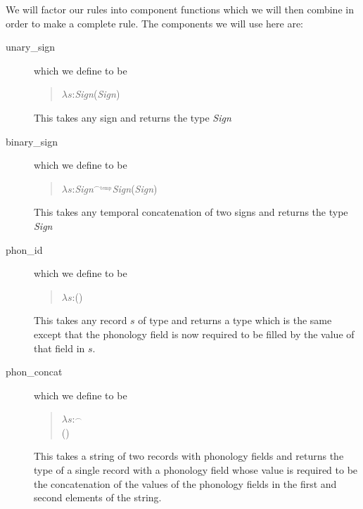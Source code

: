 We will factor our rules into component functions which we will then
combine in order to make a complete rule.  The components we will use
here are:
\begin{description}

\item[\textsf{unary\_sign}] which we define to be
\begin{quote}
$\lambda s$:\textit{Sign}(\textit{Sign})
\end{quote}
\noindent This takes any sign and returns the type \textit{Sign}

\item[\textsf{binary\_sign}] which we define to be
\begin{quote}
$\lambda s$:\textit{Sign}$^{\frown_{\mathrm{temp}}}$\textit{Sign}(\textit{Sign})
\end{quote}
\noindent This takes any temporal concatenation of two signs and returns the type
\textit{Sign}

\item[\textsf{phon\_id}] which we define to be
\begin{quote}
$\lambda
s$:()
\end{quote}
\noindent This takes any record $s$ of type
and returns a type which is the same except that the phonology field
is now required to be filled by the value of that field in $s$.

\item[\textsf{phon\_concat}] which we define to be
\begin{quote}
$\lambda
s$:$^{\frown}$
\\
\hspace*{2em}()
\end{quote}
\noindent This takes a string of two records with phonology fields and
returns the type of a single record with a phonology field whose value
is required to be the concatenation of the values of the phonology
fields in the first and second elements of the string.


\end{description}
